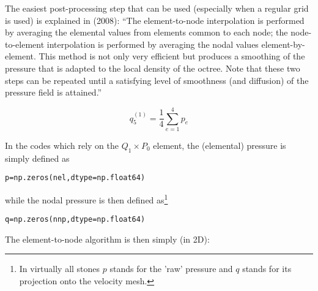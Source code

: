 The easiest post-processing step that can be used (especially when a regular grid is used) 
is explained in \textcite{thfb08} (2008): ``The element-to-node interpolation is performed by
averaging the elemental values from elements common to each node; 
the node-to-element interpolation is performed
by averaging the nodal values element-by-element. This
method is not only very efficient but produces a smoothing
of the pressure that is adapted to the local density of the
octree. Note that these two steps can be repeated until a
satisfying level of smoothness (and diffusion) of the pressure field is attained.''

\begin{center}
\end{center}
\[
q_5^{(1)} = \frac{1}{4}\sum_{e=1}^4 p_e
\] 

In the codes which rely on the $Q_1 \times P_0$ element, the (elemental) pressure
is simply defined as 
\begin{lstlisting}
p=np.zeros(nel,dtype=np.float64)  
\end{lstlisting}
while the nodal pressure is then defined as\footnote{In virtually all stones $p$
stands for the 'raw' pressure and $q$ stands for its projection onto the velocity mesh.} 
\begin{lstlisting}
q=np.zeros(nnp,dtype=np.float64)  
\end{lstlisting}
The element-to-node algorithm is then simply (in 2D):

